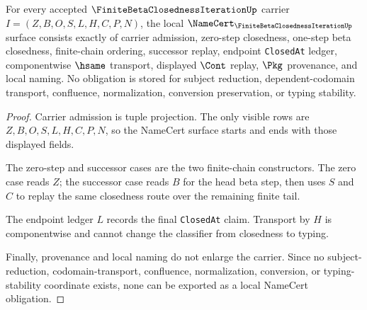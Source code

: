 \begin{theorem}
\label{thm:finite-beta-closedness-iteration-namecert-obligations}
For every accepted $\FiniteBetaClosednessIterationUp$ carrier $I=(Z,B,O,S,L,H,C,P,N)$, the local $\NameCert_{\FiniteBetaClosednessIterationUp}$ surface consists exactly of carrier admission, zero-step closedness, one-step beta closedness, finite-chain ordering, successor replay, endpoint \texttt{ClosedAt} ledger, componentwise $\hsame$ transport, displayed $\Cont$ replay, $\Pkg$ provenance, and local naming. No obligation is stored for subject reduction, dependent-codomain transport, confluence, normalization, conversion preservation, or typing stability.
\end{theorem}
\begin{proof}
Carrier admission is tuple projection. The only visible rows are $Z,B,O,S,L,H,C,P,N$, so the NameCert surface starts and ends with those displayed fields.

The zero-step and successor cases are the two finite-chain constructors. The zero case reads $Z$; the successor case reads $B$ for the head beta step, then uses $S$ and $C$ to replay the same closedness route over the remaining finite tail.

The endpoint ledger $L$ records the final \texttt{ClosedAt} claim. Transport by $H$ is componentwise and cannot change the classifier from closedness to typing.

Finally, provenance and local naming do not enlarge the carrier. Since no subject-reduction, codomain-transport, confluence, normalization, conversion, or typing-stability coordinate exists, none can be exported as a local NameCert obligation.
\end{proof}


\begin{closurestatus}{\FiniteBetaClosednessIterationUp}
  \theoryclosure{\seedClosure}
  \formalstatus{\unformalizedV}
\end{closurestatus}
